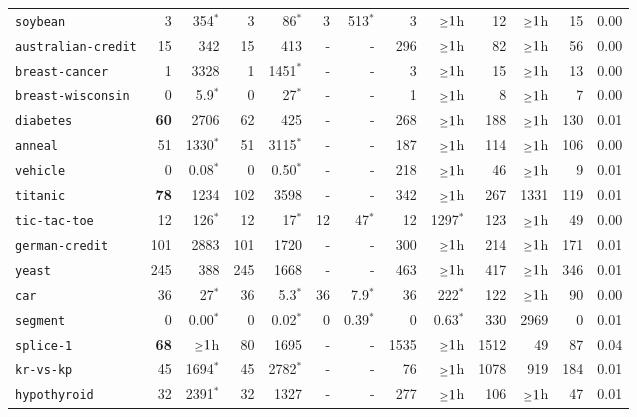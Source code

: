 \begin{tabular}{lrrrrrrrrrrrr}
\texttt{soybean} & 3 & 354$^*$ & 3 & 86$^*$ & 3 & 513$^*$ & 3 & $\mathsmaller{\geq}1$h & 12 & $\mathsmaller{\geq}1$h & 15 & 0.00\\
\texttt{australian-credit} & 15 & 342 & 15 & 413 & - & - & 296 & $\mathsmaller{\geq}1$h & 82 & $\mathsmaller{\geq}1$h & 56 & 0.00\\
\texttt{breast-cancer} & 1 & 3328 & 1 & 1451$^*$ & - & - & 3 & $\mathsmaller{\geq}1$h & 15 & $\mathsmaller{\geq}1$h & 13 & 0.00\\
\texttt{breast-wisconsin} & 0 & 5.9$^*$ & 0 & 27$^*$ & - & - & 1 & $\mathsmaller{\geq}1$h & 8 & $\mathsmaller{\geq}1$h & 7 & 0.00\\
\texttt{diabetes} & \textbf{60} & 2706 & 62 & 425 & - & - & 268 & $\mathsmaller{\geq}1$h & 188 & $\mathsmaller{\geq}1$h & 130 & 0.01\\
\texttt{anneal} & 51 & 1330$^*$ & 51 & 3115$^*$ & - & - & 187 & $\mathsmaller{\geq}1$h & 114 & $\mathsmaller{\geq}1$h & 106 & 0.00\\
\texttt{vehicle} & 0 & 0.08$^*$ & 0 & 0.50$^*$ & - & - & 218 & $\mathsmaller{\geq}1$h & 46 & $\mathsmaller{\geq}1$h & 9 & 0.01\\
\texttt{titanic} & \textbf{78} & 1234 & 102 & 3598 & - & - & 342 & $\mathsmaller{\geq}1$h & 267 & 1331 & 119 & 0.01\\
\texttt{tic-tac-toe} & 12 & 126$^*$ & 12 & 17$^*$ & 12 & 47$^*$ & 12 & 1297$^*$ & 123 & $\mathsmaller{\geq}1$h & 49 & 0.00\\
\texttt{german-credit} & 101 & 2883 & 101 & 1720 & - & - & 300 & $\mathsmaller{\geq}1$h & 214 & $\mathsmaller{\geq}1$h & 171 & 0.01\\
\texttt{yeast} & 245 & 388 & 245 & 1668 & - & - & 463 & $\mathsmaller{\geq}1$h & 417 & $\mathsmaller{\geq}1$h & 346 & 0.01\\
\texttt{car} & 36 & 27$^*$ & 36 & 5.3$^*$ & 36 & 7.9$^*$ & 36 & 222$^*$ & 122 & $\mathsmaller{\geq}1$h & 90 & 0.00\\
\texttt{segment} & 0 & 0.00$^*$ & 0 & 0.02$^*$ & 0 & 0.39$^*$ & 0 & 0.63$^*$ & 330 & 2969 & 0 & 0.01\\
\texttt{splice-1} & \textbf{68} & $\mathsmaller{\geq}1$h & 80 & 1695 & - & - & 1535 & $\mathsmaller{\geq}1$h & 1512 & 49 & 87 & 0.04\\
\texttt{kr-vs-kp} & 45 & 1694$^*$ & 45 & 2782$^*$ & - & - & 76 & $\mathsmaller{\geq}1$h & 1078 & 919 & 184 & 0.01\\
\texttt{hypothyroid} & 32 & 2391$^*$ & 32 & 1327 & - & - & 277 & $\mathsmaller{\geq}1$h & 106 & $\mathsmaller{\geq}1$h & 47 & 0.01\\

\end{tabular}
